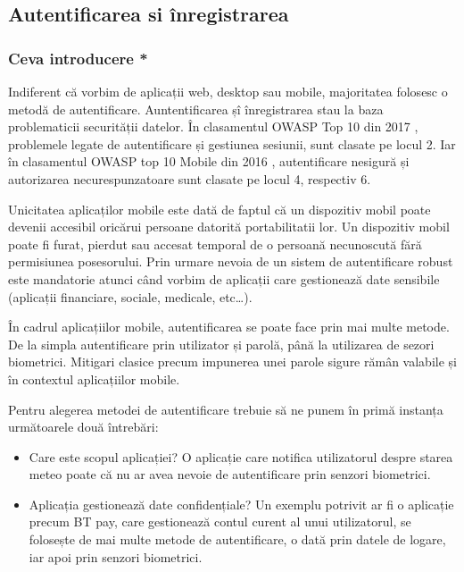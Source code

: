 \documentclass[12pt]{article}
\begin{document}
\subsection{Autentificarea si înregistrarea}
\newpage
\subsubsection{Ceva introducere *}

Indiferent că vorbim de aplicații web, desktop sau mobile, majoritatea folosesc 
o metodă de autentificare. Auntentificarea șî înregistrarea stau la baza
problematicii securității datelor. În clasamentul OWASP Top 10 din 2017 \cite{owasp-top10-2017}, 
problemele legate de autentificare și gestiunea sesiunii, sunt clasate pe locul 2. Iar în
clasamentul OWASP top 10 Mobile din 2016 \cite{owasp-top10-mobile}, autentificare nesigură
și autorizarea necurespunzatoare sunt clasate pe locul 4, respectiv 6.

Unicitatea aplicaților mobile este dată de faptul că un dispozitiv mobil
poate devenii accesibil oricărui persoane datorită portabilitatii lor. Un dispozitiv mobil
poate fi furat, pierdut sau accesat temporal de o persoană necunoscută fără permisiunea
posesorului. Prin urmare nevoia de un sistem de autentificare robust este mandatorie 
atunci când vorbim de aplicații care gestionează date sensibile (aplicații financiare, sociale,
medicale, etc\dots).

\bigskip

În cadrul aplicațiilor mobile, autentificarea se poate face prin mai multe metode. De la
simpla autentificare prin utilizator și parolă, până la utilizarea de sezori biometrici.
Mitigari clasice precum impunerea unei parole sigure rămân valabile și în 
contextul aplicațiilor mobile.


Pentru alegerea metodei de autentificare trebuie să ne punem în primă instanța următoarele două
întrebări:

\begin{itemize}
    \item Care este scopul aplicației? O aplicație care notifica utilizatorul despre starea meteo poate 
    că nu ar avea nevoie de autentificare prin senzori biometrici. 
    \item Aplicația gestionează date confidențiale? Un exemplu potrivit ar fi o aplicație precum BT pay, care gestionează 
    contul curent al unui utilizatorul,
    se folosește de mai multe metode de autentificare, o dată prin datele de logare, iar apoi
    prin senzori biometrici.
\end{itemize}
\end{document}
